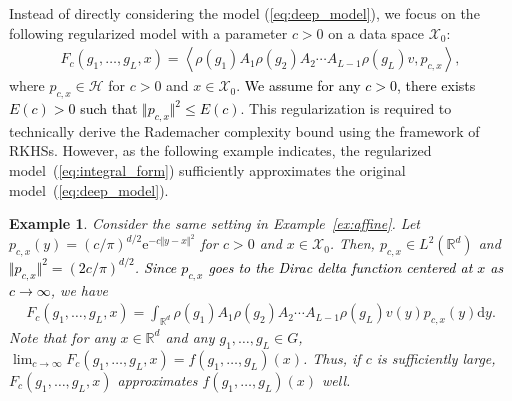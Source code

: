 \documentclass[twoside]{article}
\newtheorem{example}{Example}
\def\mcl#1{\mathcal{#1}}
\def\bracket#1{\left\langle #1\right\rangle}
\def\hil{\mcl{H}}
\def\mr{\mathrm}
\def\red#1{\textcolor{black}{#1}}
\def\eqref#1{(\ref{#1})}
\begin{document}
Instead of directly considering the model \eqref{eq:deep_model}, we focus on the following regularized model with a parameter $c>0$ on a data space $\mcl{X}_0$:
\begin{align}
F_c(g_1, \ldots, g_L, x)=\bracket{\rho(g_1) A_1 \rho(g_2) A_2 \cdots A_{L-1} \rho(g_L) v,p_{c,x}},\label{eq:integral_form}
\end{align}
where $p_{c,x}\in\hil$ for $c>0$ and $x\in \mcl{X}_0$.
\red{We assume for any $c>0$, there exists $E(c)>0$ such that $\Vert p_{c,x}\Vert^2\le E(c)$}.  
This regularization is required to technically derive the Rademacher complexity bound using the framework of RKHSs.
However, as the following example indicates, the regularized model~\eqref{eq:integral_form} sufficiently approximates the original model~\eqref{eq:deep_model}.
\begin{example}\label{ex:dirac_delta}
Consider the same setting in Example~\ref{ex:affine}.
Let $p_{c,x}(y)=(c/\pi)^{d/2}\mr{e}^{-c\Vert y-x\Vert^2}$ for $c>0$ and $x\in\mcl{X}_0$.
Then, $p_{c,x}\in L^2(\mathbb{R}^d)$ and \red{$\Vert p_{c,x}\Vert^2=(2c/\pi)^{d/2}$}.
\red{Since $p_{c,x}$ goes to the Dirac delta function centered at $x$ as $c\to\infty$}, we have 
\begin{align*}
F_c(g_1, \ldots, g_L, x)= \int_{\mathbb{R}^d} \rho(g_1) A_1 \rho(g_2) A_2 \cdots A_{L-1} \rho(g_L) v(y) p_{c,x}(y)  \mathrm{d}y.
\end{align*}
Note that for any $x\in\mathbb{R}^d$ and any $g_1,\ldots,g_L\in G$, $\lim_{c\to\infty}F_c(g_1,\ldots,g_L,x)=f(g_1,\ldots,g_L)(x)$.
Thus, if $c$ is sufficiently large, $F_c(g_1,\ldots,g_L,x)$ approximates $f(g_1,\ldots,g_L)(x)$ well.
\end{example}
\end{document}
